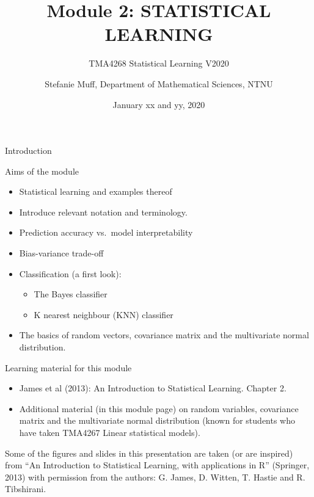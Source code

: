 \documentclass[ignorenonframetext,]{beamer}
\title{Module 2: STATISTICAL LEARNING}
\subtitle{TMA4268 Statistical Learning V2020}
\author{Stefanie Muff, Department of Mathematical Sciences, NTNU}
\date{January xx and yy, 2020}
\providecommand{\tightlist}{%
  \setlength{\itemsep}{0pt}\setlength{\parskip}{0pt}}
\begin{document}
\frame{\titlepage}

\begin{frame}{Introduction}

\begin{block}{Aims of the module}

\begin{itemize}
\tightlist
\item
  Statistical learning and examples thereof
\item
  Introduce relevant notation and terminology.
\item
  Prediction accuracy vs.~model interpretability
\item
  Bias-variance trade-off
\item
  Classification (a first look):

  \begin{itemize}
  \tightlist
  \item
    The Bayes classifier
  \item
    K nearest neighbour (KNN) classifier
  \end{itemize}
\item
  The basics of random vectors, covariance matrix and the multivariate
  normal distribution.
\end{itemize}

\end{block}

\end{frame}

\begin{frame}

\begin{block}{Learning material for this module}

\begin{itemize}
\tightlist
\item
  James et al (2013): An Introduction to Statistical Learning. Chapter
  2.\\
\item
  Additional material (in this module page) on random variables,
  covariance matrix and the multivariate normal distribution (known for
  students who have taken TMA4267 Linear statistical models).
\end{itemize}

Some of the figures and slides in this presentation are taken (or are
inspired) from ``An Introduction to Statistical Learning, with
applications in R'' (Springer, 2013) with permission from the authors:
G. James, D. Witten, T. Hastie and R. Tibshirani.

\end{block}

\end{frame}
\end{document}
